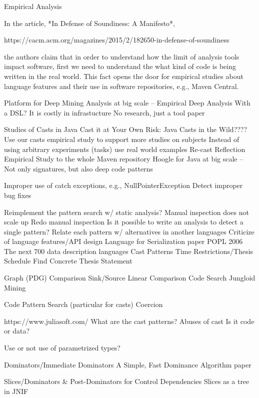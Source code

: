 Empirical Analysis


In the article, *In Defense of Soundiness: A Manifesto*,

https://cacm.acm.org/magazines/2015/2/182650-in-defense-of-soundiness

the authors claim that in order to understand how the limit of analysis tools impact software,
first we need to understand the what kind of code is being written in the real world.
This fact opens the door for empirical studies about language features and their use in
software repositories, e.g., Maven Central.


Platform for Deep Mining Analysis at big scale -- Empirical Deep Analysis
With a DSL?
It is costly in infrastucture
No research, just a tool paper

Studies of Casts in Java
Cast it at Your Own Risk: Java Casts in the Wild????
Use our casts empirical study to support more studies on subjects
Instead of using arbitrary experiments (tasks) use real world examples
Re-cast Reflection Empirical Study to the whole Maven repository
Hoogle for Java at big scale -- Not only signatures, but also deep code patterns

Improper use of catch exceptions, e.g., NullPointerException
Detect improper bug fixes


Reimplement the pattern search w/ static analysis?
Manual inspection does not scale up
Redo manual inspection
Is it possible to write an analysis to detect a single pattern?
Relate each pattern w/ alternatives in another languages
Criticize of language features/API design
Language for Serialization paper POPL 2006
The next 700 data description languages
Cast Patterns
Time Restrictions/Thesis Schedule
Find Concrete Thesis Statement


Graph (PDG) Comparison
Sink/Source
Linear Comparison
Code Search
Jungloid Mining

Code Pattern Search (particular for casts)
Coercion

https://www.juliasoft.com/
What are the cast patterns?
Abuses of cast
Is it code or data?

Use or not use of parametrized types?

Dominators/Immediate Dominators
A Simple, Fast Dominance Algorithm paper



Slices/Dominators \& Post-Dominators for Control Dependencies
Slices as a tree in JNIF
